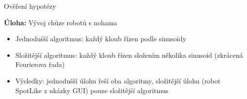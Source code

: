 \documentclass[portrait,a0paper,fontscale=0.25]{baposter}
\begin{document}
\begin{poster}
%
%
%






\begin{posterbox}[column=1, name=result1]{Ověření hypotézy}

    \textbf{Úloha:} Vývoj chůze robotů s nohama
        \begin{itemize}[leftmargin=*]
            \item Jednodušší algoritmus: každý kloub řízen podle sinusoidy
            \item Složitější algoritmus: každý kloub řízen složením několika
            sinusoid (zkrácená Fourierova řada)
            \item Výsledky: jednodušší úlohu řeší oba algoritmy, složitější úlohu
                (robot SpotLike z ukázky GUI) pouze složitější algoritmus 
        \end{itemize}
    


\end{posterbox}
\end{poster}
\end{document}

